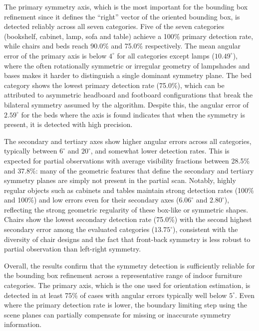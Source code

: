 The primary symmetry axis, which is the most important for the bounding box refinement since it defines the ``right'' vector of the oriented bounding box, is detected reliably across all seven categories. Five of the seven categories (bookshelf, cabinet, lamp, sofa and table) achieve a 100\% primary detection rate, while chairs and beds reach 90.0\% and 75.0\% respectively. The mean angular error of the primary axis is below $4^{\circ}$ for all categories except lamps ($10.49^{\circ}$), where the often rotationally symmetric or irregular geometry of lampshades and bases makes it harder to distinguish a single dominant symmetry plane. The bed category shows the lowest primary detection rate (75.0\%), which can be attributed to asymmetric headboard and footboard configurations that break the bilateral symmetry assumed by the algorithm. Despite this, the angular error of $2.59^{\circ}$ for the beds where the axis is found indicates that when the symmetry is present, it is detected with high precision.

The secondary and tertiary axes show higher angular errors across all categories, typically between $6^{\circ}$ and $20^{\circ}$, and somewhat lower detection rates. This is expected for partial observations with average visibility fractions between 28.5\% and 37.8\%: many of the geometric features that define the secondary and tertiary symmetry planes are simply not present in the partial scan. Notably, highly regular objects such as cabinets and tables maintain strong detection rates (100\% and 100\%) and low errors even for their secondary axes ($6.06^{\circ}$ and $2.80^{\circ}$), reflecting the strong geometric regularity of these box-like or symmetric shapes. Chairs show the lowest secondary detection rate (75.0\%) with the second highest secondary error among the evaluated categories ($13.75^{\circ}$), consistent with the diversity of chair designs and the fact that front-back symmetry is less robust to partial observation than left-right symmetry.

Overall, the results confirm that the symmetry detection is sufficiently reliable for the bounding box refinement across a representative range of indoor furniture categories. The primary axis, which is the one used for orientation estimation, is detected in at least 75\% of cases with angular errors typically well below $5^{\circ}$. Even where the primary detection rate is lower, the boundary limiting step using the scene planes can partially compensate for missing or inaccurate symmetry information.




